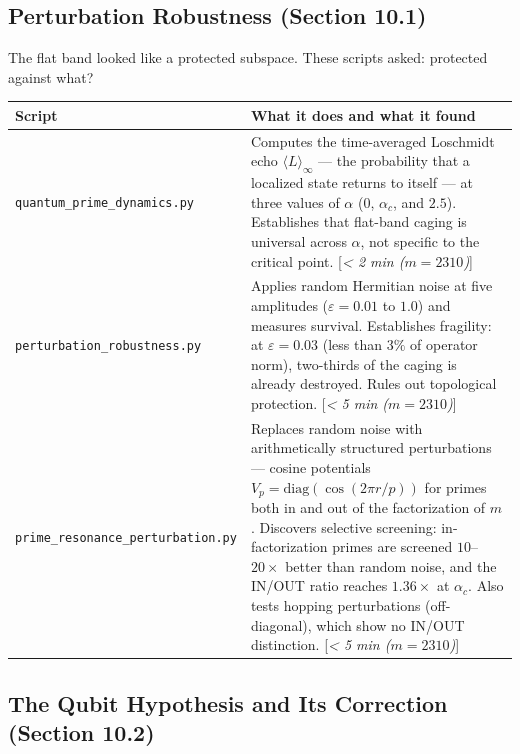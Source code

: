 \documentclass[11pt,letterpaper]{article}
\theoremstyle{definition}
\theoremstyle{remark}
\begin{document}
\subsection{Perturbation Robustness (Section 10.1)}\label{perturbation-robustness-section-10.1}

The flat band looked like a protected subspace. These scripts asked: protected against what?

\begin{longtable}[]{@{}
  >{\raggedright\arraybackslash}p{}
  >{\raggedright\arraybackslash}p{}@{}}
\toprule
Script & What it does and what it found \\
\midrule
\endfirsthead
\endhead
\texttt{quantum\_prime\_dynamics.py} & Computes the time-averaged Loschmidt echo $\langle L \rangle_\infty$ --- the probability that a localized state returns to itself --- at three values of $\alpha$ ($0$, $\alpha_c$, and $2.5$). Establishes that flat-band caging is universal across $\alpha$, not specific to the critical point. [\textit{\textless{} 2 min ($m = 2310$)}] \\
\texttt{perturbation\_robustness.py} & Applies random Hermitian noise at five amplitudes ($\varepsilon = 0.01$ to $1.0$) and measures survival. Establishes fragility: at $\varepsilon = 0.03$ (less than $3\%$ of operator norm), two-thirds of the caging is already destroyed. Rules out topological protection. [\textit{\textless{} 5 min ($m = 2310$)}] \\
\texttt{prime\_resonance\_\hspace{0pt}perturbation.py} & Replaces random noise with arithmetically structured perturbations --- cosine potentials $V_p = \text{diag}(\cos(2\pi r / p))$ for primes both in and out of the factorization of $m$. Discovers selective screening: in-factorization primes are screened $10$--$20\times$ better than random noise, and the IN/OUT ratio reaches $1.36\times$ at $\alpha_c$. Also tests hopping perturbations (off-diagonal), which show no IN/OUT distinction. [\textit{\textless{} 5 min ($m = 2310$)}] \\
\end{longtable}

\subsection{The Qubit Hypothesis and Its Correction (Section 10.2)}\label{the-qubit-hypothesis-and-its-correction-section-10.2}
\end{document}
